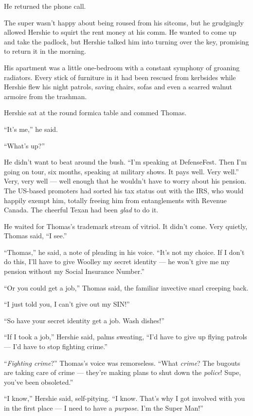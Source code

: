 He returned the phone call.

\tb

The super wasn't happy about being roused from his sitcoms, but he
grudgingly allowed Hershie to squirt the rent money at his comm. He
wanted to come up and take the padlock, but Hershie talked him into
turning over the key, promising to return it in the morning.

His apartment was a little one-bedroom with a constant symphony of
groaning radiators. Every stick of furniture in it had been rescued
from kerbsides while Hershie flew his night patrols, saving chairs,
sofas and even a scarred walnut armoire from the trashman.

Hershie sat at the round formica table and commed Thomas.

``It's me,'' he said.

``What's up?''

He didn't want to beat around the bush.
``I'm speaking at DefenseFest. Then I'm going on tour, six months, speaking at 
military shows. It pays well. Very well.''
Very, very well --- well enough that he wouldn't have to worry
about his pension. The US-based promoters had sorted his tax status
out with the IRS, who would happily exempt him, totally freeing him
from entanglements with Revenue Canada. The cheerful Texan had been
\emph{glad} to do it.

He waited for Thomas's trademark stream of vitriol. It didn't come.
Very quietly, Thomas said, ``I see.''

``Thomas,'' he said, a note of pleading in his voice.
``It's not my choice. If I don't do this, I'll have to give Woolley my secret 
identity --- he won't give me my pension without my Social Insurance Number.''

``Or you could get a job,'' Thomas said, the familiar invective
snarl creeping back.

``I just told you, I can't give out my SIN!''

``So have your secret identity get a job. Wash dishes!''

``If I took a job,'' Hershie said, palms sweating,
``I'd have to give up flying patrols --- I'd have to stop fighting crime.''

``\emph{Fighting crime}?'' Thomas's voice was remorseless.
``What \emph{crime}? The bugouts are taking care of crime --- they're making 
plans to shut down the \emph{police}! Supe, you've been obsoleted.''

``I know,'' Hershie said, self-pitying.
``I know. That's why I got involved with you in the first place --- I need to 
have a \emph{purpose}. I'm the Super Man!''

